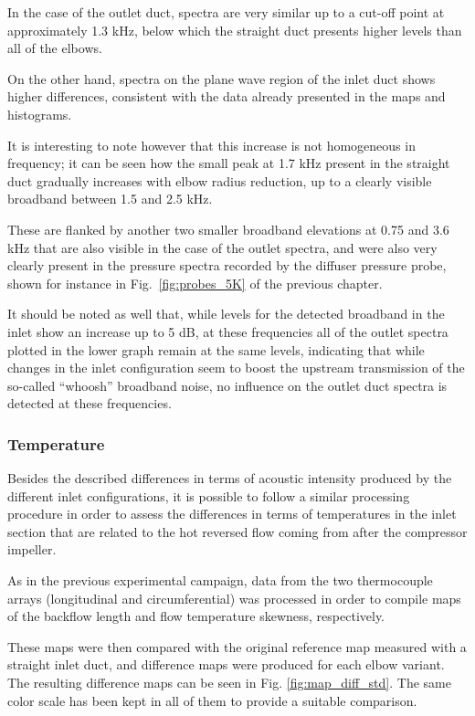 In the case of the outlet duct, spectra are very similar up to a cut-off point at approximately 1.3 kHz, below which the straight duct presents higher levels than all of the elbows.

On the other hand, spectra on the plane wave region of the inlet duct shows higher differences, consistent with the data already presented in the maps and histograms. 

It is interesting to note however that this increase is not homogeneous in frequency; it can be seen how the small peak at 1.7 kHz present in the straight duct gradually increases with elbow radius reduction, up to a clearly visible broadband between 1.5 and 2.5 kHz.

These are flanked by another two smaller broadband elevations at 0.75 and 3.6 kHz that are also visible in the case of the outlet spectra, and were also very clearly present in the pressure spectra recorded by the diffuser pressure probe, shown for instance in Fig.~\ref{fig:probes_5K} of the previous chapter.

It should be noted as well that, while levels for the detected broadband in the inlet show an increase up to 5 dB, at these frequencies all of the outlet spectra plotted in the lower graph remain at the same levels, indicating that while changes in the inlet configuration seem to boost the upstream transmission of the so-called ``whoosh'' broadband noise, no influence on the outlet duct spectra is detected at these frequencies.

\subsubsection{Temperature}

Besides the described differences in terms of acoustic intensity produced by the different inlet configurations, it is possible to follow a similar processing procedure in order to assess the differences in terms of temperatures in the inlet section that are related to the hot reversed flow coming from after the compressor impeller.

As in the previous experimental campaign, data from the two thermocouple arrays (longitudinal and circumferential) was processed in order to compile maps of the backflow length and flow temperature skewness, respectively.

These maps were then compared with the original reference map measured with a straight inlet duct, and difference maps were produced for each elbow variant. The resulting difference maps can be seen in Fig. \ref{fig:map_diff_std}. The same color scale has been kept in all of them to provide a suitable comparison.

